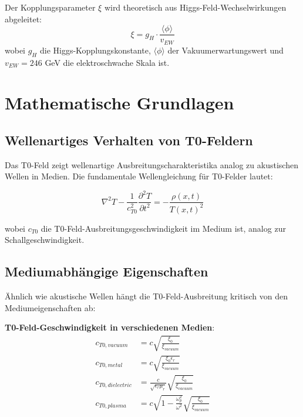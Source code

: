 \documentclass[12pt,a4paper]{article}
\newcommand{\xipar}{\xi}
\begin{document}
	Der Kopplungsparameter $\xipar$ wird theoretisch aus Higgs-Feld-Wechselwirkungen abgeleitet:
	\begin{equation}
		\xipar = g_H \cdot \frac{\langle\phi\rangle}{v_{EW}} \label{eq:xi_higgs}
	\end{equation}
	wobei $g_H$ die Higgs-Kopplungskonstante, $\langle\phi\rangle$ der Vakuumerwartungswert und $v_{EW} = 246$ GeV die elektroschwache Skala ist.
	
	\section{Mathematische Grundlagen}
	
	\subsection{Wellenartiges Verhalten von T0-Feldern}
	
	Das T0-Feld zeigt wellenartige Ausbreitungscharakteristika analog zu akustischen Wellen in Medien. Die fundamentale Wellengleichung für T0-Felder lautet:
	
	\begin{equation}
		\nabla^2 T - \frac{1}{c_{T0}^2} \frac{\partial^2 T}{\partial t^2} = -\frac{\rho(x,t)}{T(x,t)^2} \label{eq:wave_equation}
	\end{equation}
	
	wobei $c_{T0}$ die T0-Feld-Ausbreitungsgeschwindigkeit im Medium ist, analog zur Schallgeschwindigkeit.
	
	\subsection{Mediumabhängige Eigenschaften}
	
	Ähnlich wie akustische Wellen hängt die T0-Feld-Ausbreitung kritisch von den Mediumeigenschaften ab:
	
	\textbf{T0-Feld-Geschwindigkeit in verschiedenen Medien}:
	\begin{align}
		c_{T0,vacuum} &= c \sqrt{\frac{\xipar_0}{\xipar_{vacuum}}} \\
		c_{T0,metal} &= c \sqrt{\frac{\xipar_0 \epsilon_r}{\xipar_{vacuum}}} \\
		c_{T0,dielectric} &= \frac{c}{\sqrt{\epsilon_r \mu_r}} \sqrt{\frac{\xipar_0}{\xipar_{vacuum}}} \\
		c_{T0,plasma} &= c \sqrt{1 - \frac{\omega_p^2}{\omega^2}} \sqrt{\frac{\xipar_0}{\xipar_{vacuum}}}
	\end{align}
	
\end{document}
